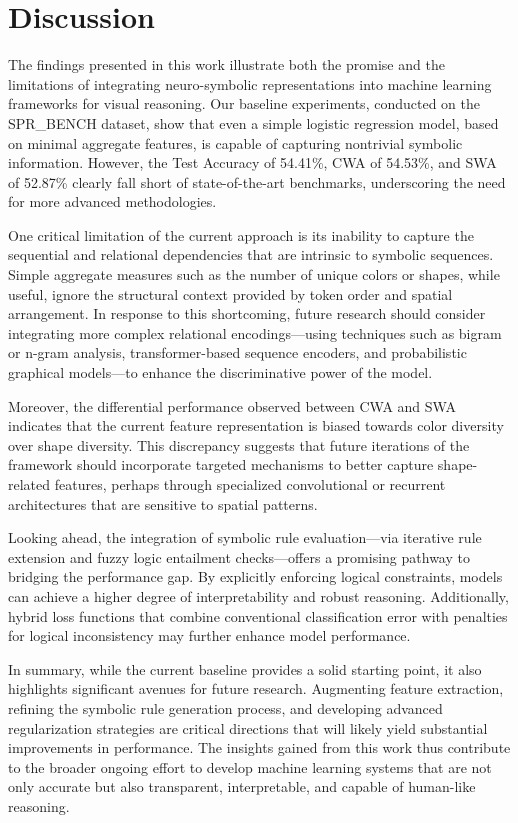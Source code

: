 \documentclass[11pt]{article}
\begin{document}
\section{Discussion}
The findings presented in this work illustrate both the promise and the limitations of integrating neuro-symbolic representations into machine learning frameworks for visual reasoning. Our baseline experiments, conducted on the SPR\_BENCH dataset, show that even a simple logistic regression model, based on minimal aggregate features, is capable of capturing nontrivial symbolic information. However, the Test Accuracy of 54.41\%, CWA of 54.53\%, and SWA of 52.87\% clearly fall short of state-of-the-art benchmarks, underscoring the need for more advanced methodologies.

One critical limitation of the current approach is its inability to capture the sequential and relational dependencies that are intrinsic to symbolic sequences. Simple aggregate measures such as the number of unique colors or shapes, while useful, ignore the structural context provided by token order and spatial arrangement. In response to this shortcoming, future research should consider integrating more complex relational encodings—using techniques such as bigram or n-gram analysis, transformer-based sequence encoders, and probabilistic graphical models—to enhance the discriminative power of the model.

Moreover, the differential performance observed between CWA and SWA indicates that the current feature representation is biased towards color diversity over shape diversity. This discrepancy suggests that future iterations of the framework should incorporate targeted mechanisms to better capture shape-related features, perhaps through specialized convolutional or recurrent architectures that are sensitive to spatial patterns.

Looking ahead, the integration of symbolic rule evaluation—via iterative rule extension and fuzzy logic entailment checks—offers a promising pathway to bridging the performance gap. By explicitly enforcing logical constraints, models can achieve a higher degree of interpretability and robust reasoning. Additionally, hybrid loss functions that combine conventional classification error with penalties for logical inconsistency may further enhance model performance.

In summary, while the current baseline provides a solid starting point, it also highlights significant avenues for future research. Augmenting feature extraction, refining the symbolic rule generation process, and developing advanced regularization strategies are critical directions that will likely yield substantial improvements in performance. The insights gained from this work thus contribute to the broader ongoing effort to develop machine learning systems that are not only accurate but also transparent, interpretable, and capable of human-like reasoning.
\end{document}
